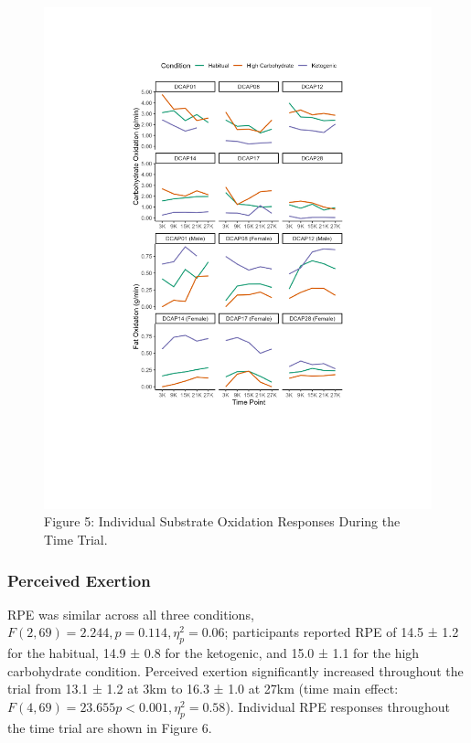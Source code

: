 \documentclass[]{cik}%
\begin{document}
\begin{figure}[H]
\includegraphics[width=1\linewidth]{figures/figure5} \caption{Figure 5: Individual Substrate Oxidation Responses During the Time Trial.}\label{fig:fig5pdf}
\end{figure}

\hypertarget{perceived-exertion}{%
\subsubsection{Perceived Exertion}\label{perceived-exertion}}

RPE was similar across all three conditions,
\(F(2, 69) = 2.244, p = 0.114, \eta^2_p = 0.06\); participants reported
RPE of 14.5 ± 1.2 for the habitual, 14.9 ± 0.8 for the ketogenic, and
15.0 ± 1.1 for the high carbohydrate condition. Perceived exertion
significantly increased throughout the trial from 13.1 ± 1.2 at 3km to
16.3 ± 1.0 at 27km (time main effect:
\(F(4, 69) = 23.655 p < 0.001, \eta^2_p = 0.58\)). Individual RPE
responses throughout the time trial are shown in Figure 6.
\end{document}
